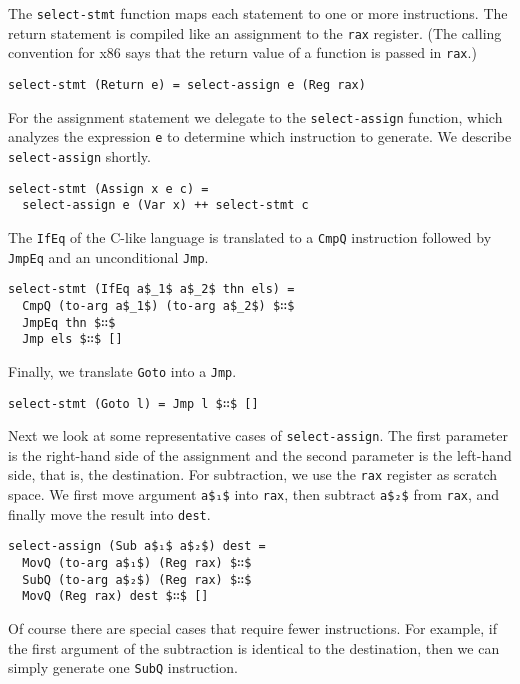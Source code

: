 \documentclass[sigplan,review,dvipsnames,screen,10pt]{acmart}
\begin{document}
\noindent The \lstinline{select-stmt} function maps each statement to
one or more instructions. The return statement is compiled like an
assignment to the \lstinline{rax} register. (The calling convention
for x86 says that the return value of a function is passed in
\lstinline{rax}.) 

\begin{lstlisting}
select-stmt (Return e) = select-assign e (Reg rax)
\end{lstlisting}

\noindent For the assignment statement we delegate to the
\lstinline{select-assign} function, which analyzes the expression
\lstinline{e} to determine which instruction to generate.
We describe \lstinline{select-assign} shortly.

\begin{lstlisting}
select-stmt (Assign x e c) =
  select-assign e (Var x) ++ select-stmt c
\end{lstlisting}

\noindent The \lstinline{IfEq} of the C-like language
is translated to a \lstinline{CmpQ} instruction followed
by \lstinline{JmpEq} and an unconditional \lstinline{Jmp}.

\begin{lstlisting}
select-stmt (IfEq a$_1$ a$_2$ thn els) =
  CmpQ (to-arg a$_1$) (to-arg a$_2$) $∷$
  JmpEq thn $∷$
  Jmp els $∷$ []
\end{lstlisting}

\noindent Finally, we translate \lstinline{Goto} into a \lstinline{Jmp}.
\begin{lstlisting}
select-stmt (Goto l) = Jmp l $∷$ [] 
\end{lstlisting}

Next we look at some representative cases of
\lstinline{select-assign}. The first parameter is the right-hand side
of the assignment and the second parameter is the left-hand side, that
is, the destination. For subtraction, we use the \lstinline{rax}
register as scratch space. We first move argument \lstinline{a$₁$}
into \lstinline{rax}, then subtract \lstinline{a$₂$} from
\lstinline{rax}, and finally move the result into \lstinline{dest}.

\begin{lstlisting}
select-assign (Sub a$₁$ a$₂$) dest =
  MovQ (to-arg a$₁$) (Reg rax) $∷$
  SubQ (to-arg a$₂$) (Reg rax) $∷$
  MovQ (Reg rax) dest $∷$ []
\end{lstlisting}

\noindent Of course there are special cases that require fewer
instructions. For example, if the first argument of the subtraction is
identical to the destination, then we can simply generate one
\lstinline{SubQ} instruction. 
\end{document}
